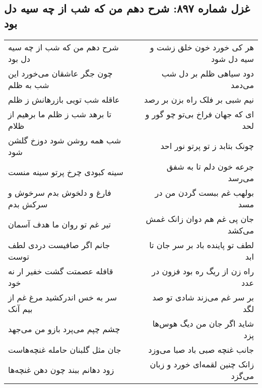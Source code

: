 \begin{center}
\section*{غزل شماره ۸۹۷: شرح دهم من که شب از چه سیه دل بود}
\label{sec:0897}
\begin{longtable}{l p{0.5cm} r}
شرح دهم من که شب از چه سیه دل بود
&&
هر کی خورد خون خلق زشت و سیه دل شود
\\
چون جگر عاشقان می‌خورد این شب به ظلم
&&
دود سیاهی ظلم بر دل شب می‌دمد
\\
عاقله شب تویی بازرهانش ز ظلم
&&
نیم شبی بر فلک راه بزن بر رصد
\\
تا برهد شب ز ظلم ما برهیم از ظلام
&&
ای که جهان فراخ بی‌تو چو گور و لحد
\\
شب همه روشن شود دوزخ گلشن شود
&&
چونک بتابد ز تو پرتو نور احد
\\
سینه کبودی چرخ پرتو سینه منست
&&
جرعه خون دلم تا به شفق می‌رسد
\\
فارغ و دلخوش بدم سرخوش و سرکش بدم
&&
بولهب غم ببست گردن من در مسد
\\
تیر غم تو روان ما هدف آسمان
&&
جان پی غم هم دوان زانک غمش می‌کشد
\\
جانم اگر صافیست دردی لطف توست
&&
لطف تو پاینده باد بر سر جان تا ابد
\\
قافله عصمتت گشت خفیر ار نه خود
&&
راه زن از ریگ ره بود فزون در عدد
\\
سر به خس اندرکشید مرغ غم از بیم آنک
&&
بر سر غم می‌زند شادی تو صد لگد
\\
چشم چپم می‌پرد بازو من می‌جهد
&&
شاید اگر جان من دیگ هوس‌ها پزد
\\
جان مثل گلبنان حامله غنچه‌هاست
&&
جانب غنچه صبی باد صبا می‌وزد
\\
زود دهانم ببند چون دهن غنچه‌ها
&&
زانک چنین لقمه‌ای خورد و زبان می‌گزد
\\
\end{longtable}
\end{center}
